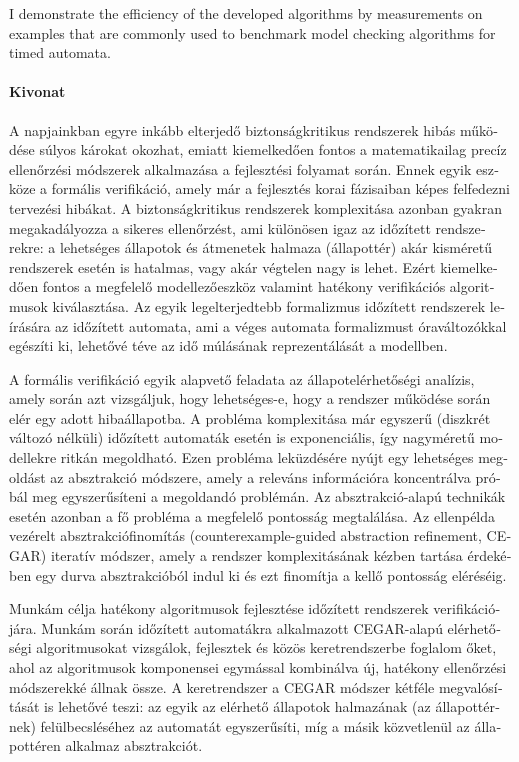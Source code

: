 I demonstrate the efficiency of the developed algorithms by measurements on examples that are commonly used to benchmark model checking algorithms for timed automata.


\cleardoublepage


\begin{otherlanguage}{magyar}
	
	\paragraph*{Kivonat}
	\thispagestyle{plain}
	
	A napjainkban egyre inkább elterjedő biztonságkritikus rendszerek hibás működése súlyos károkat okozhat, emiatt kiemelkedően fontos a matematikailag precíz ellenőrzési módszerek alkalmazása a fejlesztési folyamat során. Ennek egyik eszköze a formális verifikáció, amely már a fejlesztés korai fázisaiban képes felfedezni tervezési hibákat. A biztonságkritikus rendszerek komplexitása azonban gyakran megakadályozza a sikeres ellenőrzést, ami különösen igaz az időzített rendszerekre: a lehetséges állapotok és átmenetek halmaza (állapottér) akár kisméretű rendszerek esetén is hatalmas, vagy akár végtelen nagy is lehet. Ezért kiemelkedően fontos a megfelelő modellezőeszköz valamint hatékony verifikációs algoritmusok kiválasztása. Az egyik legelterjedtebb formalizmus időzített rendszerek leírására az időzített automata, ami a véges automata formalizmust óraváltozókkal egészíti ki, lehetővé téve az idő múlásának reprezentálását a modellben.
	
	A formális verifikáció egyik alapvető feladata az állapotelérhetőségi analízis, amely során azt vizsgáljuk, hogy lehetséges-e, hogy a rendszer működése során elér egy adott hibaállapotba. A probléma komplexitása már egyszerű (diszkrét változó nélküli) időzített automaták esetén is exponenciális, így nagyméretű modellekre ritkán megoldható. Ezen probléma leküzdésére nyújt egy lehetséges megoldást az absztrakció módszere, amely a releváns információra koncentrálva próbál meg egyszerűsíteni a megoldandó problémán. Az absztrakció-alapú technikák esetén azonban a fő probléma a megfelelő pontosság megtalálása. Az ellenpélda vezérelt absztrakciófinomítás (counterexample-guided abstraction refinement, CEGAR) iteratív módszer, amely a rendszer komplexitásának kézben tartása érdekében egy durva absztrakcióból indul ki és ezt finomítja a kellő pontosság eléréséig.
	
	Munkám célja hatékony algoritmusok fejlesztése időzített rendszerek verifikációjára. Munkám során időzített automatákra alkalmazott CEGAR-alapú elérhetőségi algoritmusokat vizsgálok, fejlesztek és közös keretrendszerbe foglalom őket, ahol az algoritmusok komponensei egymással kombinálva új, hatékony ellenőrzési módszerekké állnak össze. A keretrendszer a CEGAR módszer kétféle megvalósítását is lehetővé teszi: az egyik az elérhető állapotok halmazának (az állapottérnek) felülbecsléséhez az automatát egyszerűsíti, míg a másik közvetlenül az állapottéren alkalmaz absztrakciót.
	

\end{otherlanguage}
